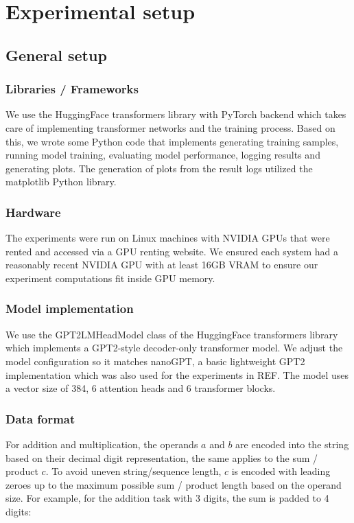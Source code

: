 \section{Experimental setup}


\subsection{General setup}
\label{setup:general}


\subsubsection{Libraries / Frameworks}

We use the HuggingFace transformers library with PyTorch backend which takes care of implementing transformer networks and the training process. Based on this, we wrote some Python code that implements generating training samples, running model training, evaluating model performance, logging results and generating plots. The generation of plots from the result logs utilized the matplotlib Python library.

\subsubsection{Hardware}
\label{expsetup:hardware}

The experiments were run on Linux machines with NVIDIA GPUs that were rented and accessed via a GPU renting website. We ensured each system had a reasonably recent NVIDIA GPU with at least 16GB VRAM to ensure our experiment computations fit inside GPU memory.

\subsubsection{Model implementation}

We use the GPT2LMHeadModel class of the HuggingFace transformers library which implements a GPT2-style decoder-only transformer model.
We adjust the model configuration so it matches nanoGPT, a basic lightweight GPT2 implementation which was also used for the experiments in REF. 
The model uses a vector size of 384, 6 attention heads and 6 transformer blocks.

\subsubsection{Data format}

For addition and multiplication, the operands $a$ and $b$ are encoded into the string based on their decimal digit representation, the same applies to the sum / product $c$. 
To avoid uneven string/sequence length, $c$ is encoded with leading zeroes up to the maximum possible sum / product length based on the operand size. For example, for the addition task with 3 digits, the sum is padded to 4 digits:

